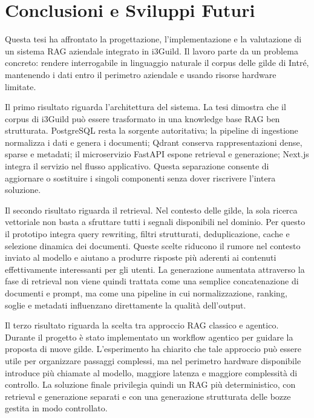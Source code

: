\chapter*{Conclusioni e Sviluppi Futuri}

Questa tesi ha affrontato la progettazione, l'implementazione e la valutazione di un sistema RAG aziendale integrato in i3Guild. 
Il lavoro parte da un problema concreto: rendere interrogabile in linguaggio naturale il corpus delle gilde di Intré, mantenendo 
i dati entro il perimetro aziendale e usando risorse hardware limitate.

Il primo risultato riguarda l'architettura del sistema. La tesi dimostra che il corpus di i3Guild può essere trasformato in 
una knowledge base RAG ben strutturata. PostgreSQL resta la sorgente autoritativa; la pipeline di ingestione normalizza i dati 
e genera i documenti; Qdrant conserva rappresentazioni dense, sparse e metadati; il microservizio FastAPI espone retrieval e 
generazione; Next.js integra il servizio nel flusso applicativo. Questa separazione consente di aggiornare o sostituire i singoli componenti senza dover riscrivere l'intera soluzione.

Il secondo risultato riguarda il retrieval. Nel contesto delle gilde, la sola ricerca vettoriale non basta 
a sfruttare tutti i segnali disponibili nel dominio. Per questo il prototipo integra query rewriting, filtri 
strutturati, deduplicazione, cache e selezione dinamica dei documenti. Queste scelte riducono il rumore nel contesto 
inviato al modello e aiutano a produrre risposte più aderenti ai contenuti effettivamente interessanti per gli utenti. 
La generazione aumentata attraverso la fase di retrieval non viene
quindi trattata come una semplice concatenazione di documenti e prompt, ma come
una pipeline in cui normalizzazione, ranking, soglie e metadati influenzano
direttamente la qualità dell'output.

Il terzo risultato riguarda la scelta tra approccio RAG classico e
agentico. Durante il progetto è stato implementato un workflow agentico per
guidare la proposta di nuove gilde. L'esperimento ha chiarito che tale approccio
può essere utile per organizzare passaggi complessi, ma nel perimetro hardware
disponibile introduce più chiamate al modello, maggiore latenza e maggiore
complessità di controllo. La soluzione finale privilegia quindi un RAG più
deterministico, con retrieval e generazione separati e con una generazione
strutturata delle bozze gestita in modo controllato.

